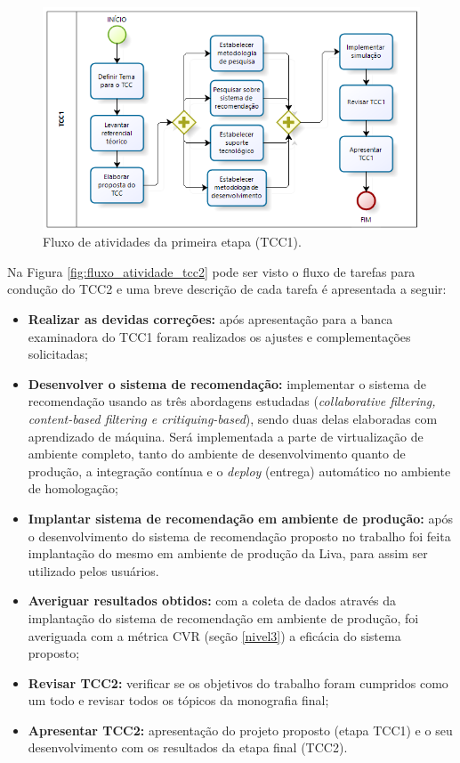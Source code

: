 \begin{figure}[H]
    \centering
    \includegraphics[scale=0.9]{figuras/proposta/fluxo_atividade_tcc1.png}
    \caption[Fluxo de atividades da primeira etapa (TCC1)]{Fluxo de atividades da primeira etapa (TCC1).}
    \label{fig:fluxo_atividade_tcc1}
\end{figure}

Na Figura \ref{fig:fluxo_atividade_tcc2} pode ser visto o fluxo de tarefas para condução do TCC2 e uma breve descrição de cada tarefa é apresentada a seguir:

\begin{itemize}
    \item \textbf{Realizar as devidas correções:} após apresentação para a banca examinadora do TCC1 foram realizados os ajustes e complementações solicitadas;

    \item \textbf{Desenvolver o sistema de recomendação:} implementar o sistema de recomendação usando as três abordagens estudadas (\textit{collaborative filtering, content-based filtering e critiquing-based}), sendo duas delas elaboradas com aprendizado de máquina. Será implementada a parte de virtualização de ambiente completo, tanto do ambiente de desenvolvimento quanto de produção, a integração contínua e o \textit{deploy} (entrega) automático no ambiente de homologação;

    \item \textbf{Implantar sistema de recomendação em ambiente de produção:} após o desenvolvimento do sistema de recomendação proposto no trabalho foi feita implantação do mesmo em ambiente de produção da Liva, para assim ser utilizado pelos usuários.

    \item \textbf{Averiguar resultados obtidos:} com a coleta de dados através da implantação do sistema de recomendação em ambiente de produção, foi averiguada com a métrica CVR (seção \ref{nivel3}) a eficácia do sistema proposto;
    
    \item \textbf{Revisar TCC2:} verificar se os objetivos do trabalho foram cumpridos como um todo e revisar todos os tópicos da monografia final;

    \item \textbf{Apresentar TCC2:} apresentação do projeto proposto (etapa TCC1) e o seu desenvolvimento com os resultados da etapa final (TCC2).
    
\end{itemize}

